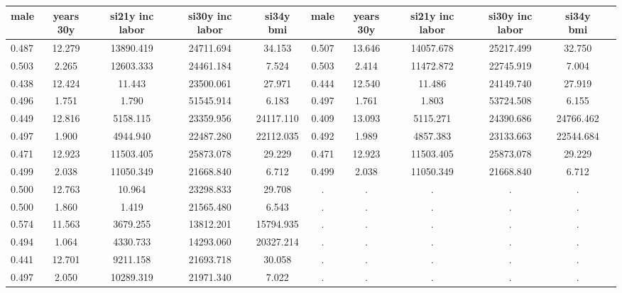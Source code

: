\begin{table}[htbp]
\begin{tabular}{lcccccccccc} \hline \hline
 \multicolumn{1}{c}{ male }  & years 30y  & si21y inc labor  & si30y inc labor  & si34y bmi  & male  & years 30y  & si21y inc labor  & si30y inc labor  & si34y bmi  \\  \hline 
    0.487 &    12.279 & 13890.419 & 24711.694 &    34.153 &     0.507 &    13.646 & 14057.678 & 25217.499 &    32.750 \\  
    0.503 &     2.265 & 12603.333 & 24461.184 &     7.524 &     0.503 &     2.414 & 11472.872 & 22745.919 &     7.004 \\  
    0.438 &    12.424 &    11.443 & 23500.061 &    27.971 &     0.444 &    12.540 &    11.486 & 24149.740 &    27.919 \\  
    0.496 &     1.751 &     1.790 & 51545.914 &     6.183 &     0.497 &     1.761 &     1.803 & 53724.508 &     6.155 \\  
    0.449 &    12.816 &  5158.115 & 23359.956 & 24117.110 &     0.409 &    13.093 &  5115.271 & 24390.686 & 24766.462 \\  
    0.497 &     1.900 &  4944.940 & 22487.280 & 22112.035 &     0.492 &     1.989 &  4857.383 & 23133.663 & 22544.684 \\  
    0.471 &    12.923 & 11503.405 & 25873.078 &    29.229 &     0.471 &    12.923 & 11503.405 & 25873.078 &    29.229 \\  
    0.499 &     2.038 & 11050.349 & 21668.840 &     6.712 &     0.499 &     2.038 & 11050.349 & 21668.840 &     6.712 \\  
    0.500 &    12.763 &    10.964 & 23298.833 &    29.708 &         . &         . &         . &         . &         . \\  
    0.500 &     1.860 &     1.419 & 21565.480 &     6.543 &         . &         . &         . &         . &         . \\  
    0.574 &    11.563 &  3679.255 & 13812.201 & 15794.935 &         . &         . &         . &         . &         . \\  
    0.494 &     1.064 &  4330.733 & 14293.060 & 20327.214 &         . &         . &         . &         . &         . \\  
    0.441 &    12.701 &  9211.158 & 21693.718 &    30.058 &         . &         . &         . &         . &         . \\  
    0.497 &     2.050 & 10289.319 & 21971.340 &     7.022 &         . &         . &         . &         . &         . \\  
\hline \hline \end{tabular}
\end{table}
